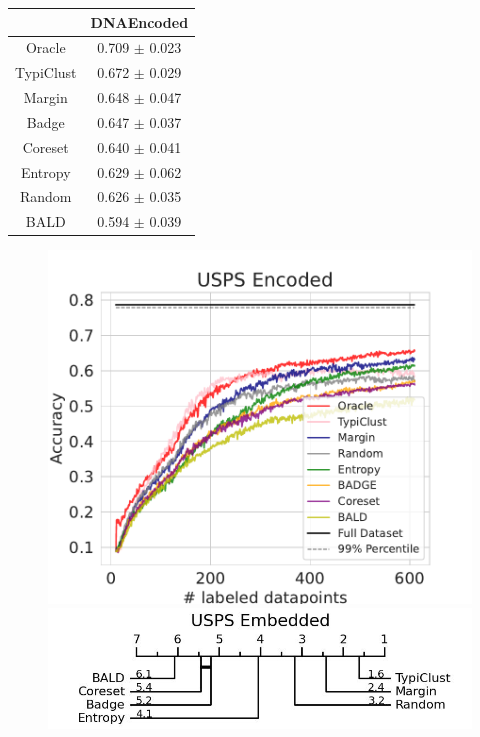\documentclass[]{article}
\begin{document}
\begin{minipage}{0.29\linewidth}
\begin{tabular}{c|c}
&DNAEncoded\\
\hline
Oracle&0.709 $\pm$ 0.023\\
TypiClust&0.672 $\pm$ 0.029\\
Margin&0.648 $\pm$ 0.047\\
Badge&0.647 $\pm$ 0.037\\
Coreset&0.640 $\pm$ 0.041\\
Entropy&0.629 $\pm$ 0.062\\
Random&0.626 $\pm$ 0.035\\
BALD&0.594 $\pm$ 0.039\\
\end{tabular}
\end{minipage}
\begin{minipage}{0.65\linewidth}
\begin{figure}[H]
    \centering
    \includegraphics[width=\linewidth]{img/eval_usps_enc}\\ [2mm]
    \includegraphics[width=\linewidth]{img/micro_usps_enc.jpg} 
\end{figure}
\end{minipage}
\end{document}
